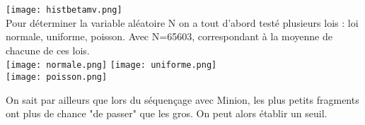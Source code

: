 \documentclass[12pt]{article}
\begin{document}
\texttt{[image: histbetamv.png]}\\
Pour déterminer la variable aléatoire N on a tout d'abord testé plusieurs lois : loi normale, uniforme, poisson. 
Avec N=65603, correspondant à la moyenne de chacune de ces lois.
\\
\texttt{[image: normale.png]}
\texttt{[image: uniforme.png]}\\
\texttt{[image: poisson.png]}

On sait par ailleurs que lors du séquençage avec Minion, les plus petits fragments ont plus de chance "de passer" que les gros.
On peut alors établir un seuil. 
\end{document}
